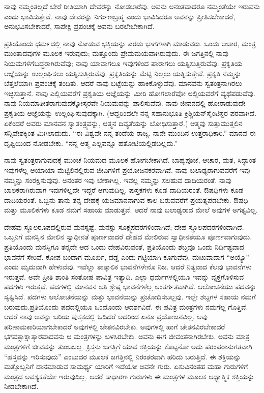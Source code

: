 ನಾವು ನಮ್ಮಂತಲ್ಲದೆ ಬೇರೆ ರೀತಿಯಾಗಿ ದೇವರನ್ನು ನೋಡಲಾರೆವು. ಅವನು ಅನಂತವಾದರೂ ನಮ್ಮಂತೆಯೇ ಇರುವನು ಎಂದು ಭಾವಿಸುತ್ತೇವೆ. ನಾವು ದೇವರನ್ನು ನಿರ್ಗುಣಬ್ರಹ್ಮ ಎಂದು ಭಾವಿಸಿದರೂ ಅವನನ್ನು ಪ್ರೀತಿಸಬೇಕಾದರೆ, ಅನುಭವಿಸಬೇಕಾದರೆ, ಸಾಪೇಕ್ಷ ಪ್ರಪಂಚಕ್ಕೆ ಅವನು ಬರಲೇಬೇಕಾಗಿದೆ.

ಪ್ರತಿಯೊಂದು ಧರ್ಮದಲ್ಲಿ ನಾವು ನೋಡುವ ಭಕ್ತಿಯನ್ನು ಎರಡು ಭಾಗಗಳಾಗಿ ಮಾಡುವರು. ಒಂದು ಆಚಾರ, ಮಂತ್ರ ಮುಂತಾದವುಗಳ ಮೂಲಕ ಇರುವುದು; ಮತ್ತೊಂದು ಪ್ರೇಮಮಯವಾಗಿರುವುದು. ಈ ಜಗತ್ತಿನಲ್ಲಿ ನಾವು ನಿಯಮಗಳಿಗೆ\break ಬದ್ಧರಾಗಿರುವೆವು; ನಾವು ಯಾವಾಗಲೂ ಇವುಗಳಿಂದ ಪಾರಾಗಲು ಯತ್ನಿಸುತ್ತಿರುವೆವು. ಪ್ರಕೃತಿಯ ಆಜ್ಞೆಯನ್ನು ಉಲ್ಲಂಘಿಸಲು ಯತ್ನಿಸುತ್ತಿರುವೆವು. ಪ್ರಕೃತಿಯನ್ನು ಮೆಟ್ಟಿ ನಿಲ್ಲಲು ಯತ್ನಿಸುತ್ತೇವೆ. ಪ್ರಕೃತಿ ನಮ್ಮನ್ನು ಬೆತ್ತಲೆಯಾಗಿ ಪ್ರಪಂಚಕ್ಕೆ ತಂದಿತು. ಆದರೆ ನಾವು ಬಟ್ಟೆಯನ್ನು ಹಾಕಿಕೊಳ್ಳುವೆವು. ಮಾನವನು ಸ್ವತಂತ್ರನಾಗಿರಲು ಇಚ್ಛಿಸುತ್ತಾನೆ. ನಾವು ಎಲ್ಲಿಯವರೆಗೆ ಪ್ರಕೃತಿಯ ಆಜ್ಞೆಯನ್ನು ಮೀರಿ ಹೋಗಲಾರೆವೋ ಅಲ್ಲಿಯವರೆಗೆ ವ್ಯಥೆಪಡುವೆವು. ನಾವು ನಿಯಮಾತೀತರಾಗುವುದಕ್ಕೋಸ್ಕರವೇ ನಿಯಮವನ್ನು ಪಾಲಿಸುವೆವು. ನಾವು ಜೀವನದಲ್ಲಿ ಹೋರಾಡುವುದೇ ಪ್ರಕೃತಿಯ ಆಜ್ಞೆಯನ್ನು ಉಲ್ಲಂಘಿಸುವುದಕ್ಕಾಗಿ. (ಆದ್ದರಿಂದಲೇ ನನ್ನ ಸಹಾನುಭೂತಿ ಕ್ರಿಶ್ಚಿಯನ್​ ಸೈಂಟಿಸ್ಟರ ಪರವಾಗಿದೆ. ಏಕೆಂದರೆ ಅವರು ಮಾನವನ ಸ್ವಾತಂತ್ರ್ಯವನ್ನು, ಆತ್ಮನ ದಿವ್ಯತೆಯನ್ನು ಬೋಧಿಸುತ್ತಾರೆ.) ಆತ್ಮವು ಸುತ್ತುಮುತ್ತಲಿನ ಸನ್ನಿವೇಶಕ್ಕಿಂತ ಮಿಗಿಲಾದುದು. “ಈ ವಿಶ್ವವೇ ನನ್ನ ತಂದೆಯ ರಾಜ್ಯ. ನಾನೇ ಮುಂದಿನ ಉತ್ತರಾಧಿಕಾರಿ.” ಮಾನವ ಈ ದೃಷ್ಟಿಯಿಂದ ನೋಡಬೇಕು. “ನನ್ನ ಆತ್ಮ ಎಲ್ಲವನ್ನೂ ಹತೋಟಿಯಲ್ಲಿಡಬಲ್ಲದು.”

\vskip 6pt

ನಾವು ಸ್ವತಂತ್ರರಾಗುವುದಕ್ಕೆ ಮುಂಚೆ ನಿಯಮದ ಮೂಲಕ ಹೋಗಬೇಕಾಗಿದೆ. ಬಾಹ್ಯಪೂಜೆ, ಆಚಾರ, ಮತ, ಸಿದ್ಧಾಂತ ಇವುಗಳೆಲ್ಲ ಆಯಾಯಾ ಮೆಟ್ಟಿಲಿನಲ್ಲಿರುವ ಜೀವಿಗಳಿಗೆ ಪ್ರಯೋಜನಕರವಾಗಿವೆ. ನಾವು ಬಲಾಢ್ಯರಾಗುವವರೆಗೆ ಇವು ನಮ್ಮನ್ನು ಸಂರಕ್ಷಿಸುವುವು. ಅನಂತರ ಇವು ಬೇಕಾಗಿಲ್ಲ. ಇವೆಲ್ಲ ನಮ್ಮನ್ನು ಸಲಹುವ ದಾದಿಯರಂತೆ. ನಾವು ಬಾಲಕರಾಗಿರುವಾಗ ಇವುಗಳಿಲ್ಲದೇ ಇದ್ದರೆ ಆಗುವುದಿಲ್ಲ. ಪುಸ್ತಕಗಳು ಕೂಡ ದಾದಿಯರಂತೆ. ಔಷಧಿಗಳು ಕೂಡ ದಾದಿಯರಂತೆ. ಒಬ್ಬನು ತಾನು ತನ್ನ ದೇಹಕ್ಕೆ ಯಜಮಾನನಾಗುವ ಕಾಲ ಬರುವವರೆಗೆ ಪ್ರಯತ್ನಪಡಬೇಕು. ಔಷಧಿ ಮತ್ತು ಮೂಲಿಕೆಗಳು ಕೂಡ ನಮಗೆ ಸಹಾಯ ಮಾಡುತ್ತವೆ. ಆದರೆ ನಾವು ಬಲಾಢ್ಯರಾದ ಮೇಲೆ ಅವುಗಳ ಅಗತ್ಯವಿಲ್ಲ.

\vskip 6pt

ದೇಹವು ಸ್ಥೂಲರೂಪದಲ್ಲಿರುವ ಮನಸ್ಸಷ್ಟೆ. ಮನಸ್ಸು ಸೂಕ್ಷ್ಮಪದರಗಳಿಂದಾಗಿದೆ; ದೇಹ ಸ್ಥೂಲಪದರಗಳಿಂದಾಗಿದೆ. ಒಬ್ಬನಿಗೆ ಮನಸ್ಸಿನ ಮೇಲಿನ ಸ್ವಾಧೀನತೆ ಪೂರ್ಣ\-ವಾದರೆ ದೇಹದ ಮೇಲಿರುವ ಸ್ವಾಧೀನತೆಯೂ ಪೂರ್ಣವಾಗುವುದು. ಪ್ರತಿಯೊಂದು ಮನಸ್ಸಿಗೂ ತನ್ನದೇ ಆದ ಒಂದು ದೇಹವಿರುವಂತೆ, ಪ್ರತಿಯೊಂದು ಶಬ್ದವೂ ಒಂದು ನಿರ್ದಿಷ್ಟವಾದ ಭಾವನೆಗೆ ಸೇರಿವೆ. ಕೋಪ ಬಂದಾಗ ಮೂರ್ಖ, ದಡ್ಡ ಎಂದು ಗಟ್ಟಿಯಾಗಿ ಕೂಗುವೆವು. ದುಃಖವಾದಾಗ “ಅಯ್ಯೊ” ಎಂದು ಮೃದುವಾಗಿ ಹೇಳುವೆವು. ಇವೆಲ್ಲಾ ತಾತ್ಕಾಲಿಕ ಭಾವನೆಗಳೇನೊ ನಿಜ. ಆದರೆ ನಿತ್ಯವಾದ ಕೆಲವು ಭಾವನೆಗಳು ಇರುತ್ತವೆ. ಅವೇ ಪ್ರೀತಿ ಶಾಂತಿ ಸಂತೋಷ ಪಾವಿತ್ರ ಇತ್ಯಾದಿ. ಎಲ್ಲಾ ಧರ್ಮಗಳಲ್ಲಿಯೂ ಇವನ್ನು ವ್ಯಕ್ತಗೊಳಿಸುವ ಪದಗಳು ಇರುತ್ತವೆ. ಪದಗಳಲ್ಲಿ ಮಾನವನ ಅತಿ ಶ್ರೇಷ್ಠ ಭಾವನೆಗಳೆಲ್ಲ ಅಂತರ್ಗತವಾಗಿವೆ. ಆಲೋಚನೆಯು ಪದವನ್ನು ಸೃಷ್ಟಿಸಿದೆ. ಪದಗಳು ಆಲೋಚನೆಯನ್ನು ಮತ್ತು ಭಾವನೆಯನ್ನು ಪ್ರಚೋದಿಸಬಲ್ಲವು. ಇಲ್ಲೇ ಶಬ್ದಗಳ ಸಹಾಯ ನಮಗೆ ಬರುವುದು.\break ಪ್ರತಿಯೊಂದು ಪದದಲ್ಲಿಯೂ ಒಂದೊಂದು ಆದರ್ಶವಿದೆ. ಈ ಪವಿತ್ರ ಮಂತ್ರಗಳು ನಮಗೆಲ್ಲ ಗೊತ್ತಿವೆ. ಆದರೆ ನಾವು ಅವನ್ನು ಬರಿಯ ಪುಸ್ತಕದಲ್ಲಿ ಓದಿದರೆ ಅದರಿಂದ ಏನೂ ಪ್ರಯೋಜನವಿಲ್ಲ. ಅವು ಪರಿಣಾಮಕಾರಿಯಾಗಬೇಕಾದರೆ ಅವುಗಳಲ್ಲಿ ಚೇತನವಿರಬೇಕು. ಅವುಗಳಲ್ಲಿ ಹಾಗೆ ಚೇತನವಿರಬೇಕಾದರೆ ಭಗವತ್ಸಾಕ್ಷಾತ್ಕಾರವಾದವನು ಆ ಮಂತ್ರಗಳನ್ನು ಬಳಸಿರಬೇಕು. ಅವನು ಈಗ ಜೀವಂತನಾಗಿರಬೇಕು. ಅವನು ಮಾತ್ರ ಮಂತ್ರಗಳಿಗೆ ಜೀವವನ್ನು ತುಂಬಬಲ್ಲ. ಕ್ರಿಸ್ತನು ಜಗತ್ತಿಗೆ ಯಾವ ಶಕ್ತಿಯನ್ನು ಕೊಟ್ಟನೋ ಅದು ಪರಂಪರಾನುಗತವಾಗಿ “ಹಸ್ತವನ್ನು ಇರಿಸುವುದು” ಎಂಬುದರ ಮೂಲಕ ಜಗತ್ತಿನಲ್ಲಿ ನಿರಂತರವಾಗಿ ಹರಿದು ಬರುತ್ತಿದೆ. ಈ ಶಕ್ತಿಯನ್ನು ಮತ್ತೊಬ್ಬನಿಗೆ ದಾನಮಾಡುವ ಸಾಮರ್ಥ್ಯ ಯಾರಿಗೆ ಇದೆಯೋ ಅವನೇ ಗುರು. ಏಸುವಿನಂತಹ ಮಹಾ ಗುರುಗಳಿಗೆ ಮಂತ್ರದ ಅವಶ್ಯಕತೆಯೇ ಇರುವುದಿಲ್ಲ. ಆದರೆ ಸಾಧಾರಣ ಗುರುಗಳು ಈ ಮಂತ್ರಗಳ ಮೂಲಕ ಆಧ್ಯಾತ್ಮಿಕ ಶಕ್ತಿಯನ್ನು ನೀಡಬೇಕಾಗಿದೆ.

